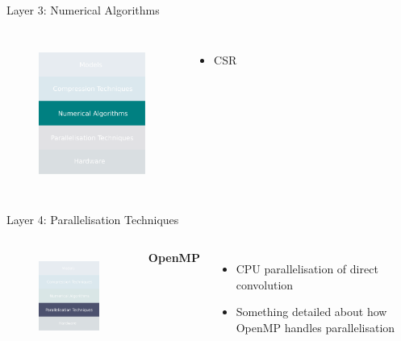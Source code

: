 \documentclass[xcolor=dvipsnames]{beamer}
\begin{document}
\begin{frame}{Layer 3: Numerical Algorithms}

\begin{columns}


\begin{figure}
    \centering
    \includegraphics[width=3.5cm]{images/numericals.pdf}
    \label{fig:inference-stack-nums-2}
\end{figure}

\begin{itemize}
    \item CSR
\end{itemize}

\end{columns}
\end{frame}

\begin{frame}{Layer 4: Parallelisation Techniques}

\begin{columns}


\begin{figure}
    \centering
    \includegraphics[width=3.5cm]{images/parallelisations.pdf}
    \label{fig:inference-stack-parallels}
\end{figure}


\textbf{OpenMP}
\begin{itemize}
    \item CPU parallelisation of direct convolution 
    \item Something detailed about how OpenMP handles parallelisation
\end{itemize}

\end{columns}

\end{frame}
\end{document}
